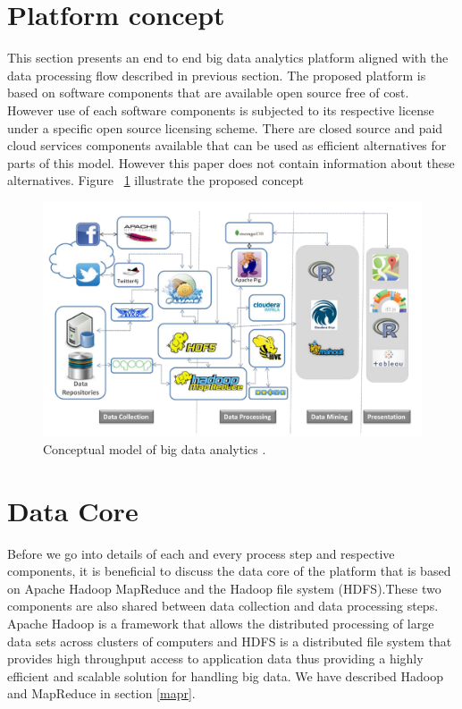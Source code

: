  \section{Platform concept}
 This section presents an end to end big data analytics platform aligned with the data processing flow described in previous section. The proposed platform is based on software components that are available open source free of cost. However use of each software components is subjected to its respective license under a specific open source licensing scheme. There are closed source and paid cloud services components available that can be used as efficient alternatives for parts of this model. However this paper does not contain information about these alternatives. Figure ~\ref{fig:cplatform} illustrate the proposed concept
 \begin{figure}[!h]
    \begin{center}
      \includegraphics[width=\textwidth]{images/cplatform.pdf}
      \caption{Conceptual model of big data analytics .}
      \label{fig:cplatform}
    \end{center}
  \end{figure} 
\section{Data Core}
Before we go into details of each and every process step and respective components, it is beneficial to discuss the data core of the platform that is based on Apache Hadoop MapReduce and the Hadoop file system (HDFS).These two components are also shared between data collection and data processing steps.  Apache Hadoop is a framework that allows the distributed processing of large data sets across clusters of computers and HDFS is a distributed file system that provides high throughput access to application data\cite{apachehadoop} thus providing a highly efficient and scalable solution for handling big data. We have described Hadoop and MapReduce in section \ref{mapr}.
